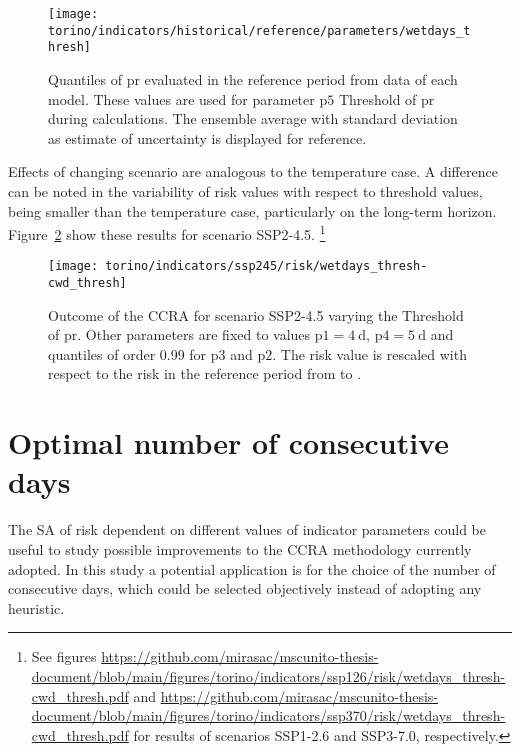 \begin{figure}
  \centering
  \texttt{[image: torino/indicators/historical/reference/parameters/wetdays\_thresh]}
  \caption{Quantiles of \gls{pr} evaluated in the reference period from data of each model. These values are used for parameter $\mathrm{p5}$ {Threshold of \gls{pr}} during calculations. The ensemble average with standard deviation as estimate of uncertainty is displayed for reference.}
  \label{fig:parameters_wetdays_thresh}
\end{figure}

Effects of changing scenario are analogous to the temperature case. A difference can be noted in the variability of risk values with respect to threshold values, being smaller than the temperature case, particularly on the long-term horizon. Figure~\ref{fig:ssp245_risk_wetdays_thresh-cwd_thresh} show these results for scenario SSP2-4.5.%
\footnote{See figures \url{https://github.com/mirasac/mscunito-thesis-document/blob/main/figures/torino/indicators/ssp126/risk/wetdays_thresh-cwd_thresh.pdf} and \url{https://github.com/mirasac/mscunito-thesis-document/blob/main/figures/torino/indicators/ssp370/risk/wetdays_thresh-cwd_thresh.pdf} for results of scenarios SSP1-2.6 and SSP3-7.0, respectively.}

\begin{figure}
  \centering
  \texttt{[image: torino/indicators/ssp245/risk/wetdays\_thresh-cwd\_thresh]}
  \caption{Outcome of the \gls{CCRA} for scenario SSP2-4.5 varying the {Threshold of \gls{pr}}. Other parameters are fixed to values $\mathrm{p1} = \qty{4}{\day}$, $\mathrm{p4} = \qty{5}{\day}$ and quantiles of order 0.99 for $\mathrm{p3}$ and $\mathrm{p2}$. The risk value is rescaled with respect to the risk in the reference period from  to .}
  \label{fig:ssp245_risk_wetdays_thresh-cwd_thresh}
\end{figure}



\section{Optimal number of consecutive days}
The \gls{SA} of risk dependent on different values of indicator parameters could be useful to study possible improvements to the \gls{CCRA} methodology currently adopted. In this study a potential application is for the choice of the number of consecutive days, which could be selected objectively instead of adopting any heuristic.

